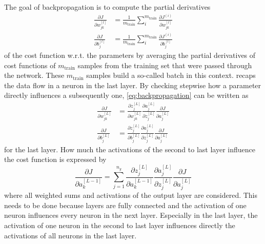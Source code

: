 The goal of backpropagation is to compute the partial derivatives
\begin{subequations}
	\label{eq:backpropagation}
	\begin{align}
		\frac{\partial J}{\partial w^{[l]}_{jk}} &= \frac{1}{m_{\text{train}}} \sum_{i}^{m_{\text{train}}} \frac{\partial J^{(i)}}{\partial w^{[l]}_{jk}} \\
		\frac{\partial J}{\partial b^{[l]}_j} &= \frac{1}{m_{\text{train}}} \sum_{i}^{m_{\text{train}}} \frac{\partial J^{(i)}}{\partial b^{[l]}_j}
	\end{align}
\end{subequations}
of the cost function w.r.t. the parameters by averaging the partial derivatives of cost functions of $m_{\text{train}}$ samples from the training set that were passed through the network.
These $m_{\text{train}}$ samples build a so-called batch in this context.
 recaps the data flow in a neuron in the last layer.
By checking stepwise how a parameter directly influences a subsequently one, \eqref{eq:backpropagation} can be written as
\begin{subequations}
	\label{eq:backpropagation-last}
	\begin{align}
		\frac{\partial J}{\partial w^{[L]}_{jk}} &= \frac{\partial z^{[L]}_j}{\partial w^{[L]}_{jk}} \frac{\partial a^{[L]}_{j}}{\partial z^{[L]}_{j}} \frac{\partial J}{\partial a^{[L]}_{j}} \\
		\frac{\partial J}{\partial b^{[L]}_{j}} &= \frac{\partial z^{[L]}_j}{\partial b^{[L]}_{j}} \frac{\partial a^{[L]}_{j}}{\partial z^{[L]}_{j}} \frac{\partial J}{\partial a^{[L]}_{j}}
	\end{align}
\end{subequations}
for the last layer.
How much the activations of the second to last layer influence the cost function is expressed by
\begin{equation}
	\label{eq:backpropagation-activations-last}
	\frac{\partial J}{\partial a^{[L-1]}_{k}} = \sum_{j=1}^{n_y} \frac{\partial z^{[L]}_j}{\partial a^{[L-1]}_{k}} \frac{\partial a^{[L]}_{j}}{\partial z^{[L]}_{j}} \frac{\partial J}{\partial a^{[L]}_{j}}
\end{equation}
where all weighted sums and activations of the output layer are considered.
This needs to be done because layers are fully connected and the activation of one neuron influences every neuron in the next layer.
Especially in the last layer, the activation of one neuron in the second to last layer influences directly the activations of all neurons in the last layer.
